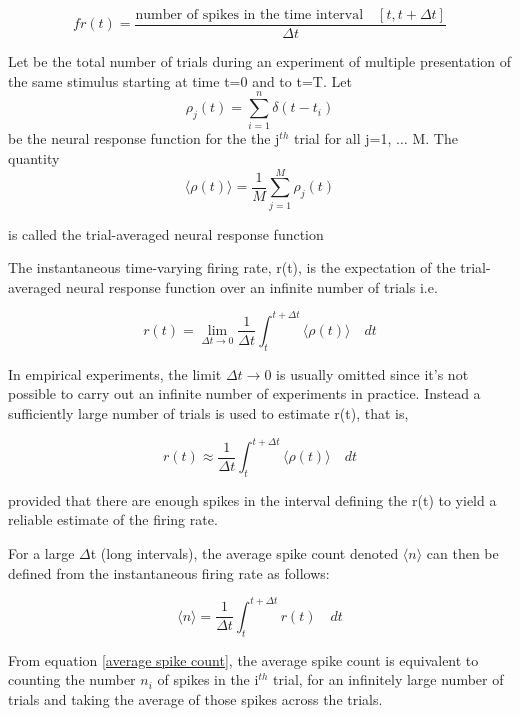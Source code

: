 \begin{equation}\label{single-trial emprical-spike count}
fr(t) = \dfrac{\text{number of spikes in the time interval} \quad [t, t+\Delta t]}
{\Delta t}
\end{equation}


\begin{Def}\label{trial-average neural response}
Let  be the total number of trials during an experiment
of multiple presentation of the same stimulus starting at time t=0 and to t=T. 
Let \[ \rho_{j}(t) = \displaystyle \sum_{i=1}^{n} \delta(t-t_{i})\] 
be the neural response function for the the j$^{th}$ trial for all j=1, $\dots$ M. The quantity 
\[ \langle \rho(t) \rangle  = 
\displaystyle  \frac{1}{M} \sum_{j=1}^{M} \rho_{j}(t)\] 

is called the trial-averaged neural response function

\end{Def}

The instantaneous time-varying firing rate, r(t), is the expectation of the 
trial-averaged neural response function over an infinite number of trials i.e.

\begin{equation} \label{expected FireRate}
r(t) = \displaystyle  \lim_{\Delta t \rightarrow 0}    \frac{1}{\Delta t}  \int_{t}^{t+\Delta t} 
 \langle \rho(t) \rangle \quad dt 
\end{equation}


In empirical experiments, the limit ${\Delta t \rightarrow 0}$ is usually
omitted since it's not possible to carry out an infinite number of experiments
in practice. Instead a sufficiently large number of trials is used
to estimate r(t), that is,

\[ 
r(t) \approx  \displaystyle  \frac{1}{\Delta t}  \int_{t}^{t+\Delta t} 
 \langle \rho(t) \rangle \quad dt 
\]

provided that there are enough spikes in the interval defining the r(t)
to yield a reliable estimate of the firing rate.

For a large $\Delta$t (long intervals), the average spike count denoted $\langle n  \rangle$ can then be  defined from the instantaneous firing rate as follows:

\begin{equation}\label{average spike count}
\langle n \rangle =  \displaystyle  \frac{1}{\Delta t}  
\int_{t}^{t+\Delta t}  r(t)  \quad dt 
\end{equation}

From equation \eqref{average spike count}, the average spike count is equivalent
to counting the number $n_{i}$  of spikes in the i$^{th}$ trial, for an infinitely large number of trials and taking the average of those spikes across the trials.



